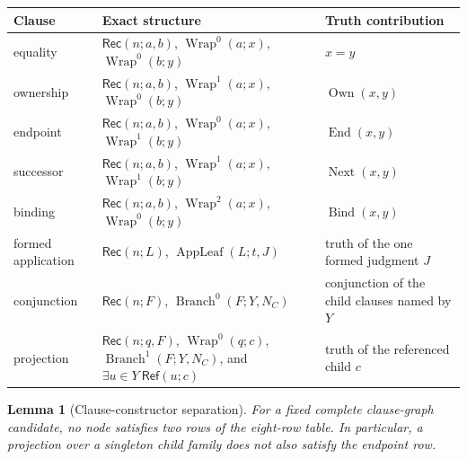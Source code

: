 \documentclass[11pt,twoside]{article}
\newcommand{\Rec}{\mathsf{Rec}}
\newcommand{\RefPos}{\mathsf{Ref}}
\newtheorem{lemma}[theorem]{Lemma}
\begin{document}
\begin{center}
\begin{tabularx}{0.96\textwidth}{@{}>{\raggedright\arraybackslash}p{}
                                      >{\raggedright\arraybackslash}p{}
                                      X@{}}
\toprule
Clause & Exact structure & Truth contribution\\
\midrule
equality & \(\Rec(n;a,b)\), \(\operatorname{Wrap}^0(a;x)\),
\(\operatorname{Wrap}^0(b;y)\) & \(x=y\)\\
ownership & \(\Rec(n;a,b)\), \(\operatorname{Wrap}^1(a;x)\),
\(\operatorname{Wrap}^0(b;y)\) & \(\operatorname{Own}(x,y)\)\\
endpoint & \(\Rec(n;a,b)\), \(\operatorname{Wrap}^0(a;x)\),
\(\operatorname{Wrap}^1(b;y)\) & \(\operatorname{End}(x,y)\)\\
successor & \(\Rec(n;a,b)\), \(\operatorname{Wrap}^1(a;x)\),
\(\operatorname{Wrap}^1(b;y)\) & \(\operatorname{Next}(x,y)\)\\
binding & \(\Rec(n;a,b)\), \(\operatorname{Wrap}^2(a;x)\),
\(\operatorname{Wrap}^0(b;y)\) & \(\operatorname{Bind}(x,y)\)\\
formed application & \(\Rec(n;L)\),
\(\operatorname{AppLeaf}(L;t,J)\) & truth of the one formed judgment \(J\)\\
conjunction & \(\Rec(n;F)\), \(\operatorname{Branch}^0(F;Y,N_C)\)
& conjunction of the child clauses named by \(Y\)\\
projection & \(\Rec(n;q,F)\), \(\operatorname{Wrap}^0(q;c)\),
\(\operatorname{Branch}^1(F;Y,N_C)\), and
\(\exists u\in Y\ \RefPos(u;c)\) & truth of the referenced child \(c\)\\
\bottomrule
\end{tabularx}
\end{center}

\begin{lemma}[Clause-constructor separation]\label{lem:clause-separation}
For a fixed complete clause-graph candidate, no node satisfies two rows of the
eight-row table.  In particular, a projection over a singleton child family does
not also satisfy the endpoint row.
\end{lemma}
\end{document}
